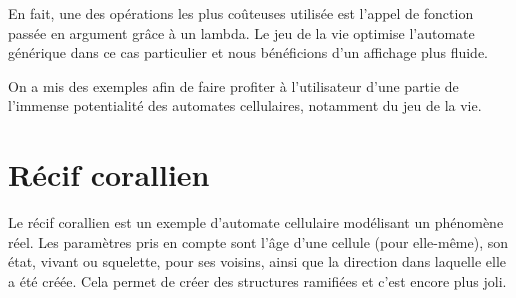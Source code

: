 \documentclass[a4paper]{article}
\begin{document}
En fait, une des opérations les plus coûteuses utilisée est l'appel de fonction passée en argument grâce à un lambda. Le jeu de la vie optimise l'automate générique dans ce cas particulier et nous bénéficions d'un affichage plus fluide.

On a mis des exemples afin de faire profiter à l'utilisateur d'une partie de l'immense potentialité des automates cellulaires, notamment du jeu de la vie.

\section{Récif corallien}

Le récif corallien est un exemple d'automate cellulaire modélisant un phénomène réel. Les paramètres pris en compte sont l'âge d'une cellule (pour elle-même), son état, vivant ou squelette, pour ses voisins, ainsi que la direction dans laquelle elle a été créée. Cela permet de créer des structures ramifiées et c'est encore plus joli.
\end{document}
